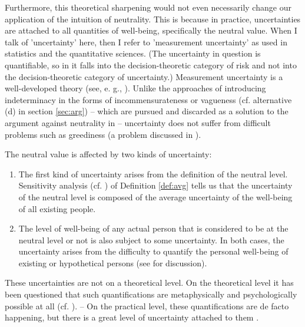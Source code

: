 Furthermore, this theoretical sharpening would not even necessarily change our application of the intuition of neutrality. This is because in practice, uncertainties are attached to all quantities of well-being, specifically the neutral value. When I talk of 'uncertainty' here, then I refer to 'measurement uncertainty' as used in statistics and the quantitative sciences. (The uncertainty in question is quantifiable, so in it falls into the decision-theoretic category of risk and not into the decision-theoretic category of uncertainty.) Measurement uncertainty is a well-developed theory (see, e. g., ). Unlike the approaches of introducing indeterminacy in the forms of incommensurateness or vagueness (cf. alternative (d) in section \ref{sec:arg}) -- which are pursued and discarded as a solution to the argument against neutrality in  -- uncertainty does not suffer from difficult problems such as greediness (a problem discussed in ).  

The neutral value is affected by two kinds of uncertainty: 
\begin{enumerate}
\item The first kind of uncertainty arises from the definition of the neutral level. Sensitivity analysis (cf. ) of Definition \ref{def:avg} tells us that the uncertainty of the neutral level is composed of the average uncertainty of the well-being of all existing people. 
\item The level of well-being of any actual person that is considered to be at the neutral level or not is also subject to some uncertainty. In both cases, the uncertainty arises from the difficulty to quantify the personal well-being of existing or hypothetical persons (see  for discussion). 
\end{enumerate}
These uncertainties are not on a theoretical level. On the theoretical level it has been questioned that such quantifications are metaphysically and psychologically possible at all (cf. ). -- On the practical level, these quantifications are de facto happening, but there is a great level of uncertainty attached to them \cite[ch.~9]{broome_2004}. 

\begin{comment}
Person q from Proof \ref{prf:arg} is at different levels in scenario A and B. We can interpret the neutral range as a neutral level $u_0 = u_1 + (u_2 - u_1) / 2$ with an uncertainty of $\sigma (u_0) = \pm (u_2 - u_1) / 2$. As a consequence, the different values of well-being for person q in scenarios A and B are compatible with the assumption that there is a single neutral level with $u_0$ with an uncertainty of $\sigma(u0)$.
\end{comment}

